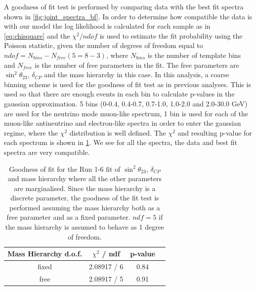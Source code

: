 
A goodness of fit test is performed by comparing data with the best fit spectra shown in \cref{fig:joint_spectra_bf}.
In order to determine how compatible the data is with our model 
the log likelihood is calculated for each sample as in \cref{eq:chisquare}
and the $\chi^2 / ndof$ is used to estimate the fit probability using the Poisson statistic, 
given the number of degrees of freedom equal to $ndof = N_{bins} - N_{free} (5 = 8-3)$,
where $N_{bins}$ is the number of template bins and $N_{free}$ is the number of free parameters in the fit.
The free parameters are $\sin^2 \theta_{23}$, $\delta_{CP}$ and the mass hierarchy in this case. 
In this analysis, a coarse binning scheme is used for the goodness of fit test as in previous analyses. 
This is used so that there are enough events in each bin to calculate p-values in the gaussian approximation. 
5 bins (0-0.4, 0.4-0.7, 0.7-1.0, 1.0-2.0 and 2.0-30.0 GeV) are used for the neutrino mode muon-like spectrum, 
1 bin is used for each of the muon-like antineutrino and electron-like spectra
in order to enter the gaussian regime, where the $\chi^2$ distribution is well defined.
The $\chi^2$ and resulting p-value for each spectrum is shown in \cref{tab:goodness_of_fit}. 
We see for all the spectra, the data and best fit spectra are very compatible.

\begin{table}[htb]
\centering
\begin{tabular}{| c | c | c | c |}
\hline
Mass Hierarchy d.o.f.			& $\chi^2$ / ndf        		& p-value \\ \hline
fixed					 		& 2.08917 / 6                  	& 0.84	\\ \hline
free							& 2.08917 / 5                  	& 0.91	\\ \hline
\end{tabular}
\caption{
Goodness of fit for the Run 1-6 fit of $\sin^2 \theta_{23}$, $\delta_{CP}$ and mass hierarchy 
where all the other parameters are marginalised. 
Since the mass hierarchy is a discrete parameter, the goodness of the fit test 
is performed assuming the mass hierarchy both as a free parameter and as a fixed parameter.
$ndf = 5$ if the mass hierarchy is assumed to behave as 1 degree of freedom.
}
\label{tab:goodness_of_fit}
\end{table}





%
%

